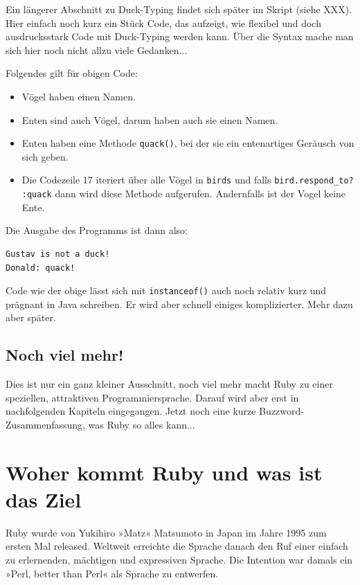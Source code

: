 \documentclass[a4book,11pt,twoside]{scrbook}
\begin{document}
Ein längerer Abschnitt zu Duck-Typing findet sich später im Skript (siehe XXX). Hier einfach noch kurz ein Stück Code, das aufzeigt, wie flexibel und doch ausdrucksstark Code mit Duck-Typing werden kann. Über die Syntax mache man sich hier noch nicht allzu viele Gedanken...



Folgendes gilt für obigen Code:
\begin{itemize}
	\item Vögel haben einen Namen.
	\item Enten sind auch Vögel, darum haben auch sie einen Namen.
	\item Enten haben eine Methode \texttt{quack()}, bei der sie ein entenartiges Geräusch von sich geben.
	\item Die Codezeile 17 iteriert über alle Vögel in \texttt{birds} und falls \texttt{bird.respond\_to? :quack} dann wird diese Methode aufgerufen. Andernfalls ist der Vogel keine Ente.
\end{itemize}

Die Ausgabe des Programms ist dann also:

\begin{lstlisting}
Gustav is not a duck!
Donald: quack!
\end{lstlisting}

Code wie der obige lässt sich mit \texttt{instanceof()} auch noch relativ kurz und prägnant in Java schreiben. Er wird aber schnell einiges komplizierter. Mehr dazu aber später.



\subsection*{Noch viel mehr!} %
\label{sub:noch_viel_mehr_}
Dies ist nur ein ganz kleiner Ausschnitt, noch viel mehr macht Ruby zu einer speziellen, attraktiven Programmiersprache. Darauf wird aber erst in nachfolgenden Kapiteln eingegangen. Jetzt noch eine kurze Buzzword-Zusammenfassung, was Ruby so alles kann...




\section{Woher kommt Ruby und was ist das Ziel} %
\label{sec:woher_kommt_ruby_und_was_ist_das_ziel}
Ruby wurde von Yukihiro »Matz« Matsumoto in Japan im Jahre 1995 zum ersten Mal released. Weltweit erreichte die Sprache danach den Ruf einer einfach zu erlernenden, mächtigen und expressiven Sprache.
Die Intention war damals ein »Perl, better than Perl« als Sprache zu entwerfen.
\end{document}
